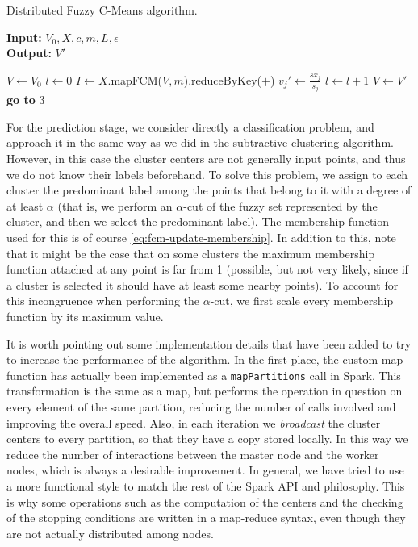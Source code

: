\begin{algorithm}
  \caption{Distributed Fuzzy C-Means algorithm.}
    \label{alg:fcm}
    \textbf{Input:} $V_0,X,c,m,L, \epsilon$\\
    \textbf{Output:} $V'$
  \begin{algorithmic}[1]
    \State $V \gets V_0$ 
    \State $l \gets 0$
    \State $I \gets X$.mapFCM($V,m$).reduceByKey($+$) 
     
      \State $\displaystyle v_j' \gets \frac{sx_j}{s_j}$
    \EndFor
    \State $l \gets l+1$
     
      \State {}
    \Else
      \State $V \gets V'$
      \State \textbf{go to} 3
    \EndIf
  \end{algorithmic}
\end{algorithm}

For the prediction stage, we consider directly a classification problem, and approach it in the same way as we did in the subtractive clustering algorithm. However, in this case the cluster centers are not generally input points, and thus we do not know their labels beforehand. To solve this problem, we assign to each cluster the predominant label among the points that belong to it with a degree of at least $\alpha$ (that is, we perform an $\alpha$-cut of the fuzzy set represented by the cluster, and then we select the predominant label). The membership function used for this is of course \eqref{eq:fcm-update-membership}. In addition to this, note that it might be the case that on some clusters the maximum membership function attached at any point is far from 1 (possible, but not very likely, since if a cluster is selected it should have at least some nearby points). To account for this incongruence when performing the $\alpha$-cut, we first scale every membership function by its maximum value.

It is worth pointing out some implementation details that have been added to try to increase the performance of the algorithm. In the first place, the custom map function has actually been implemented as a \verb|mapPartitions| call in Spark. This transformation is the same as a map, but performs the operation in question on every element of the same partition, reducing the number of calls involved and improving the overall speed. Also, in each iteration we \textit{broadcast} the cluster centers to every partition, so that they have a copy stored locally. In this way we reduce the number of interactions between the master node and the worker nodes, which is always a desirable improvement. In general, we have tried to use a more functional style to match the rest of the Spark API and philosophy. This is why some operations such as the computation of the centers and the checking of the stopping conditions are written in a map-reduce syntax, even though they are not actually distributed among nodes.


